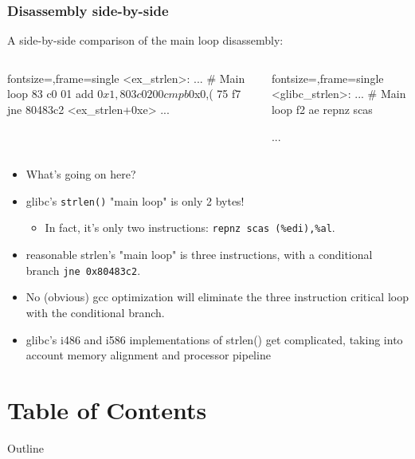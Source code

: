 \documentclass[11pt,xcolor=dvipsnames]{beamer}
\newcommand{\vs}{\vspace{0.5em}}
\newcommand{\mvs}{\vspace{-0.95em}}
\begin{document}
\begin{frame}[fragile,t]
\frametitle{Disassembly side-by-side}
\mvs
A side-by-side comparison of the main loop disassembly:\vspace{-0.8em}
\begin{columns}[T]
\begin{customobjdumpcode*}{fontsize=\fontsize{6.5}{8},frame=single}
<ex_strlen>:
...
# Main loop
83 c0 01        add    $0x1,%
80 3c 02 00     cmpb   $0x0,(%
75 f7           jne    80483c2 <ex_strlen+0xe>
...
\end{customobjdumpcode*}
\begin{customobjdumpcode*}{fontsize=\fontsize{6.5}{8},frame=single}
<glibc_strlen>:
...
# Main loop
f2 ae           repnz scas %


...
\end{customobjdumpcode*}
\end{columns}
\vs
\begin{itemize}
        \item What's going on here?
        \pause
        \item glibc's \verb+strlen()+ "main loop" is only 2 bytes!
        \begin{itemize}
                \item In fact, it's only two instructions: \verb+repnz scas (%edi),%al+.
        \end{itemize}
        \pause
        \item reasonable strlen's "main loop" is three instructions, with a conditional branch \verb+jne 0x80483c2+.
        \pause
        \item No (obvious) gcc optimization will eliminate the three instruction critical loop with the conditional branch.
        \item glibc's i486 and i586 implementations of {\ttfamily strlen()} get complicated, taking into account memory alignment and processor pipeline
\end{itemize}
\end{frame}

\section*{Table of Contents}
\begin{frame}{Outline}
\tableofcontents[part=1]
\end{frame}
\end{document}
